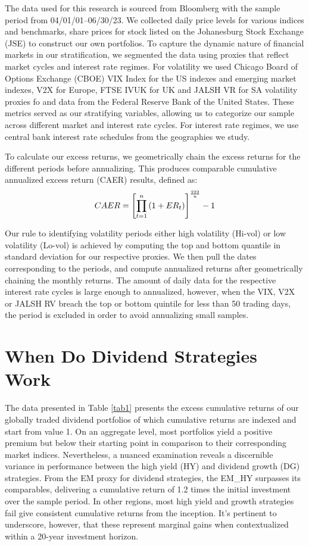 \documentclass[12pt,preprint, authoryear]{elsarticle}
\numberwithin{equation}{section}
\numberwithin{figure}{section}
\numberwithin{table}{section}
\begin{document}
The data used for this research is sourced from Bloomberg with the
sample period from 04/01/01--06/30/23. We collected daily price levels
for various indices and benchmarks, share prices for stock listed on the
Johanesburg Stock Exchange (JSE) to construct our own portfolios. To
capture the dynamic nature of financial markets in our stratification,
we segmented the data using proxies that reflect market cycles and
interest rate regimes. For volatility we used Chicago Board of Options
Exchange (CBOE) VIX Index for the US indexes and emerging market
indexes, V2X for Europe, FTSE IVUK for UK and JALSH VR for SA volatility
proxies fo and data from the Federal Reserve Bank of the United States.
These metrics served as our stratifying variables, allowing us to
categorize our sample across different market and interest rate cycles.
For interest rate regimes, we use central bank interest rate schedules
from the geographies we study.

To calculate our excess returns, we geometrically chain the excess
returns for the different periods before annualizing. This produces
comparable cumulative annualized excess return (CAER) results, defined
as: \begin{align}
C A E R=\left[\prod_{t=1}^n\left(1+E R_t\right)\right]^{\frac{222}{n}}-1 \notag
\end{align}

Our rule to identifying volatility periods either high volatility
(Hi-vol) or low volatility (Lo-vol) is achieved by computing the top and
bottom quantile in standard deviation for our respective proxies. We
then pull the dates corresponding to the periods, and compute annualized
returns after geometrically chaining the monthly returns. The amount of
daily data for the respective interest rate cycles is large enough to
annualized, however, when the VIX, V2X or JALSH RV breach the top or
bottom quintile for less than 50 trading days, the period is excluded in
order to avoid annualizing small samples.

\hypertarget{when-do-dividend-strategies-work}{%
\section{When Do Dividend Strategies
Work}\label{when-do-dividend-strategies-work}}

The data presented in Table \ref{tab1} presents the excess cumulative
returns of our globally traded dividend portfolios of which cumulative
returns are indexed and start from value 1. On an aggregate level, most
portfolios yield a positive premium but below their starting point in
comparison to their corresponding market indices. Nevertheless, a
nuanced examination reveals a discernible variance in performance
between the high yield (HY) and dividend growth (DG) strategies. From
the EM proxy for dividend strategies, the EM\_HY surpasses its
comparables, delivering a cumulative return of 1.2 times the initial
investment over the sample period. In other regions, most high yield and
growth strategies fail give consistent cumulative returns from the
inception. It's pertinent to underscore, however, that these represent
marginal gains when contextualized within a 20-year investment horizon.
\end{document}
